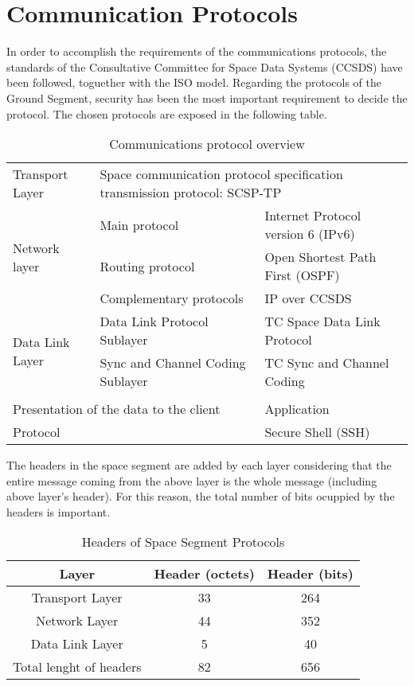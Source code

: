 \section{Communication Protocols}
In order to accomplish the requirements of the communications protocols, the standards of the Consultative Committee for Space Data Systems (CCSDS) have been followed, toguether with the ISO model. Regarding the protocols of the Ground Segment, security has been the most important requirement to decide the protocol. The chosen protocols are exposed in the following table.
\begin{table}[H]
\begin{center}
\begin{tabular}{|l|l|l|}
\hline
\rowcolor{blue} \multicolumn{3}{|c|}{\textbf{Space segment: CCSDS Standards}}\\
\hline
Transport Layer&\multicolumn{2}{|l|}{Space communication protocol specification transmission protocol: SCSP-TP}\\
\hline
\multirow{3}{*}{Network layer}&Main protocol&Internet Protocol version 6 (IPv6)\\
&Routing protocol&Open Shortest Path First (OSPF)\\
&Complementary protocols&IP over CCSDS\\
\hline
\multirow{2}{*}{Data Link Layer}&Data Link Protocol Sublayer&TC Space Data Link Protocol\\
&Sync and Channel Coding Sublayer&TC Sync and Channel Coding\\
\hline
\rowcolor{blue} \multicolumn{3}{|c|}{\textbf{Ground segment}}\\
\hline
\multicolumn{2}{|l|}{Presentation of the data to the client}&Application\\
\hline
\multicolumn{2}{|l|}{Protocol}&Secure Shell (SSH)\\
\hline
\end{tabular}
\caption{Communications protocol overview}
\end{center}
\end{table}
The headers in the space segment are added by each layer considering that the entire message coming from the above layer is the whole message (including above layer's header). For this reason, the total number of bits ocuppied by the headers is important. 
\begin{table}[H]
\begin{center}
\begin{tabular}{|c|c|c|}
\hline
\rowcolor{blue}\textbf{Layer}&\textbf{Header (octets)}&\textbf{Header (bits)}\\
\hline
Transport Layer&33&264\\
\hline
Network Layer&44&352\\
\hline
Data Link Layer&5&40\\
\hline
\cellcolor{blue}Total lenght of headers&82&656\\
\hline
\end{tabular}
\caption{Headers of Space Segment Protocols}
\end{center}
\end{table}
